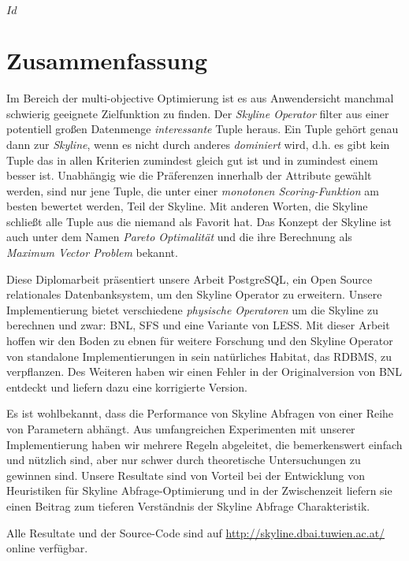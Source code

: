 
\svnInfo $Id$


\chapter*{Zusammenfassung\revision}

Im Bereich der multi-objective Optimierung ist es aus Anwendersicht
manchmal schwierig geeignete Zielfunktion zu finden.
%
Der \emph{Skyline Operator} filter aus einer potentiell gro\ss{}en
Datenmenge \emph{interessante} Tuple heraus.
%
Ein Tuple geh\"ort genau dann zur \emph{Skyline}, wenn es nicht durch
anderes \emph{dominiert} wird, d.h. es gibt kein Tuple das in allen
Kriterien zumindest gleich gut ist und in zumindest einem besser ist.
%
Unabh\"angig wie die Pr\"aferenzen innerhalb der Attribute gew\"ahlt
werden, sind nur jene Tuple, die unter einer \emph{monotonen
Scoring-Funktion} am besten bewertet werden, Teil der Skyline.
%
Mit anderen Worten, die Skyline schlie\ss{}t alle Tuple aus die
niemand als Favorit hat.
%
Das Konzept der Skyline ist auch unter dem Namen \emph{Pareto
Optimalit\"at} und die ihre Berechnung als \emph{Maximum Vector
Problem} bekannt.


Diese Diplomarbeit pr\"asentiert unsere Arbeit PostgreSQL, ein Open
Source relationales Datenbanksystem, um den Skyline Operator zu
erweitern.
%
Unsere Implementierung bietet verschiedene \emph{physische Operatoren}
um die Skyline zu berechnen und zwar: BNL, SFS und eine Variante von
LESS.
%
Mit dieser Arbeit hoffen wir den Boden zu ebnen f\"ur weitere
Forschung und den Skyline Operator von standalone Implementierungen in
sein nat\"urliches Habitat, das RDBMS, zu verpflanzen.
%
Des Weiteren haben wir einen Fehler in der Originalversion von BNL
entdeckt und liefern dazu eine korrigierte Version.


Es ist wohlbekannt, dass die Performance von Skyline Abfragen von einer
Reihe von Parametern abh\"angt.
%
Aus umfangreichen Experimenten mit unserer Implementierung haben wir
mehrere Regeln abgeleitet, die bemerkenswert einfach und n\"utzlich
sind, aber nur schwer durch theoretische Untersuchungen zu gewinnen
sind.
%
Unsere Resultate sind von Vorteil bei der Entwicklung von Heuristiken
f\"ur Skyline Abfrage-Optimierung und in der Zwischenzeit liefern sie
einen Beitrag zum tieferen Verst\"andnis der Skyline Abfrage
Charakteristik.


Alle Resultate und der Source-Code sind auf
\url{http://skyline.dbai.tuwien.ac.at/} online verf\"ugbar.
